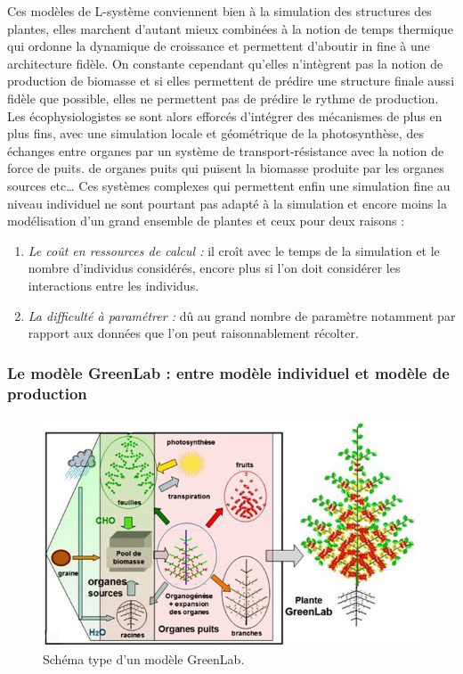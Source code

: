 {Ces modèles de L-système conviennent bien à la simulation des structures des
plantes, elles marchent d’autant mieux combinées à la notion de temps
thermique qui ordonne la dynamique de croissance et permettent d’aboutir 
in fine à une architecture fidèle. On constante cependant
qu'elles n’intègrent pas la notion de
production de biomasse et si elles permettent de prédire une structure
finale aussi fidèle que possible, elles ne permettent pas de prédire le
rythme de production. Les écophysiologistes se sont alors efforcés
d’intégrer des mécanismes de plus en plus fins, avec une simulation locale
et géométrique de la photosynthèse, des échanges entre organes par un
système de transport-résistance avec la notion de force de puits. de organes
puits qui puisent la biomasse produite par les organes sources etc… 
Ces systèmes complexes qui permettent enfin une simulation fine au niveau
individuel ne sont pourtant pas adapté à la simulation et encore moins la modélisation d’un grand ensemble de plantes et ceux pour deux raisons : 
\begin{enumerate}
\item \emph{Le coût en ressources de calcul :} il croît avec le temps de la simulation et le nombre d’individus considérés, encore plus si l’on doit considérer les interactions entre les individus.
\item \emph{La difficulté à paramétrer :} dû au grand nombre de paramètre notamment par rapport aux données que l’on peut raisonnablement récolter.
\end{enumerate}

\subsubsection[Le modèle GreenLab]{Le modèle GreenLab : entre modèle individuel et modèle de production}

\begin{figure}[h]
	\begin{center}
  \includegraphics[scale=1.0]{./img/sGL.jpg}
  \caption{Schéma type d'un modèle GreenLab.}
  \label{fig:schemaGL}
  \end{center}
\end{figure}

}
